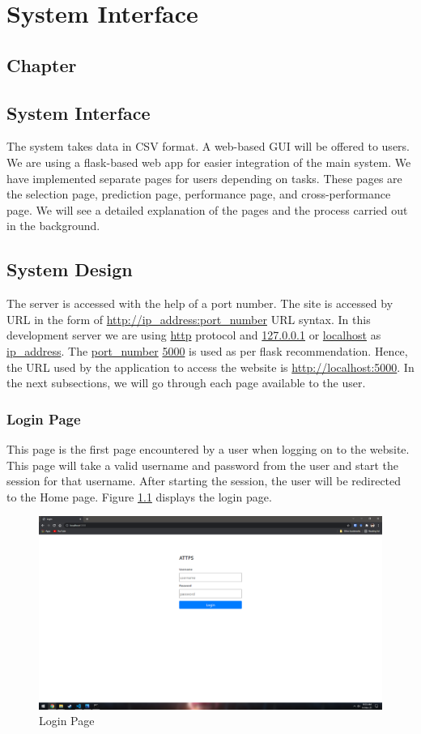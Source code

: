 \thispagestyle{fancy}
\chapter{System Interface} \label{ch:system_interface}
\section*{\centering Chapter \thechapter}
\section*{\centering System Interface}

The system takes data in CSV format. A web-based GUI will be offered to users. We are using a
flask-based web app for easier integration of the main system. We have implemented separate
pages for users depending on tasks. These pages are the selection page, prediction page,
performance page, and cross-performance page. We will see a detailed explanation of the pages
and the process carried out in the background.

\section{System Design} \label{sec:system_design}

The server is accessed with the help of a port number. The site is accessed by URL in the form
of \url{http://ip_address:port_number} URL syntax. In this development server we are using
\url{http} protocol and \url{127.0.0.1} or \url{localhost} as \url{ip_address}. The
\url{port_number} \url{5000} is used as per flask recommendation. Hence, the URL used by the
application to access the website is \url{http://localhost:5000}. In the next subsections, we
will go through each page available to the user.

\subsection{Login Page} \label{subsec:login_page}
This page is the first page encountered by a user when logging on to the website. This page
will take a valid username and password from the user and start the session for that username.
After starting the session, the user will be redirected to the Home page. Figure
\ref{fig:web_login_page} displays the login page.

\begin{figure}[H]
    \centering
    \includegraphics[width=0.7\columnwidth]{media/website/pages/00_login.png}
    \caption{Login Page}
    \label{fig:web_login_page}
\end{figure}

